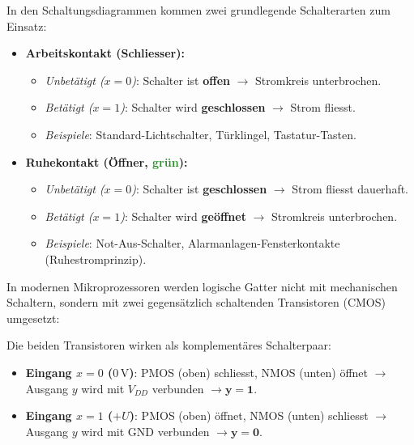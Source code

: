 \begin{myremark}
    In den Schaltungsdiagrammen kommen zwei grundlegende Schalterarten zum Einsatz:
    \begin{center}
        
    \end{center}
    \begin{itemize}
        \item \textbf{Arbeitskontakt (Schliesser):}
            \begin{itemize}
                \item \emph{Unbetätigt ($x=0$)}: Schalter ist \textbf{offen} $\rightarrow$ Stromkreis unterbrochen.
                \item \emph{Betätigt ($x=1$)}: Schalter wird \textbf{geschlossen} $\rightarrow$ Strom fliesst.
                \item \emph{Beispiele}: Standard-Lichtschalter, Türklingel, Tastatur-Tasten.
            \end{itemize}
        \item \textbf{Ruhekontakt (Öffner, \textcolor{ForestGreen}{grün}):}
            \begin{itemize}
                \item \emph{Unbetätigt ($x=0$)}: Schalter ist \textbf{geschlossen} $\rightarrow$ Strom fliesst dauerhaft.
                \item \emph{Betätigt ($x=1$)}: Schalter wird \textbf{geöffnet} $\rightarrow$ Stromkreis unterbrochen.
                \item \emph{Beispiele}: Not-Aus-Schalter, Alarmanlagen-Fensterkontakte (Ruhestromprinzip).
            \end{itemize}
    \end{itemize}
\end{myremark}

\begin{myremark}
    In modernen Mikroprozessoren werden logische Gatter nicht mit mechanischen Schaltern, sondern mit zwei gegensätzlich schaltenden Transistoren (CMOS) umgesetzt:
    \begin{center}
        
    \end{center}
    Die beiden Transistoren wirken als komplementäres Schalterpaar:
    \begin{itemize}
        \item \textbf{Eingang $x = 0$ ($0\,\text{V}$)}: PMOS (oben) schliesst, NMOS (unten) öffnet $\rightarrow$ Ausgang $y$ wird mit $V_{DD}$ verbunden $\rightarrow \mathbf{y = 1}$.
        \item \textbf{Eingang $x = 1$ ($+U$)}: PMOS (oben) öffnet, NMOS (unten) schliesst $\rightarrow$ Ausgang $y$ wird mit GND verbunden $\rightarrow \mathbf{y = 0}$.
    \end{itemize}
\end{myremark}

